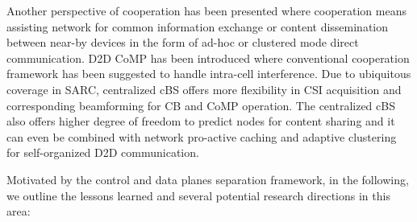 \documentclass[article,10pt,twocolumn]{IEEEtran}
\begin{document}
Another perspective of cooperation has been presented where cooperation means assisting network for common information exchange or content dissemination between near-by devices in the form of ad-hoc or clustered mode direct communication. D2D CoMP has been introduced where conventional cooperation framework has been suggested to handle intra-cell interference. Due to ubiquitous coverage in SARC, centralized cBS offers more flexibility in CSI acquisition and corresponding beamforming for CB and CoMP operation. The centralized cBS also offers higher degree of freedom to predict nodes for content sharing and it can even be combined with network pro-active caching and adaptive clustering for self-organized D2D communication. 

Motivated by the control and data planes separation framework, in the following, we outline the lessons learned and several potential research directions in this area:
\end{document}
